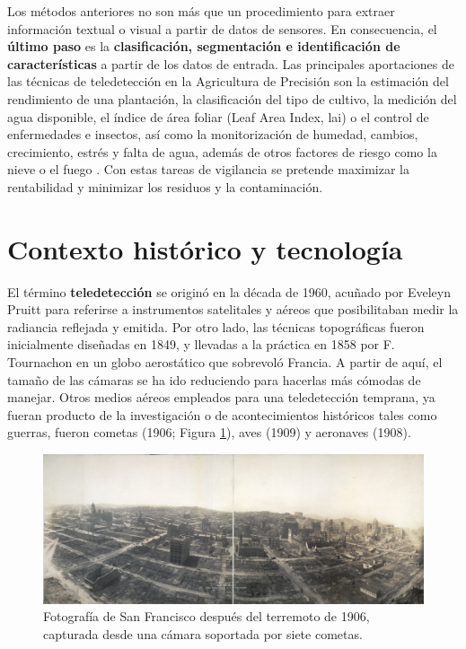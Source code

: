 Los métodos anteriores no son más que un procedimiento para extraer información textual o visual a partir de datos de sensores. En consecuencia, el \textbf{último paso} es la \textbf{clasificación, segmentación e identificación de características} a partir de los datos de entrada. Las principales aportaciones de las técnicas de teledetección en la Agricultura de Precisión son la estimación del rendimiento de una plantación, la clasificación del tipo de cultivo, la medición del agua disponible, el índice de área foliar (Leaf Area Index, \acrshort{lai}) o el control de enfermedades e insectos, así como la monitorización de humedad, cambios, crecimiento, estrés y falta de agua, además de otros factores de riesgo como la nieve o el fuego \cite{huang_agricultural_2018}. Con estas tareas de vigilancia se pretende maximizar la rentabilidad y minimizar los residuos y la contaminación. 

\section{Contexto histórico y tecnología}

El término \textbf{teledetección} se originó en la década de 1960, acuñado por Eveleyn Pruitt para referirse a instrumentos satelitales y aéreos que posibilitaban medir la radiancia reflejada y emitida. Por otro lado, las técnicas topográficas fueron inicialmente diseñadas en 1849, y llevadas a la práctica en 1858 por F. Tournachon en un globo aerostático que sobrevoló Francia. A partir de aquí, el tamaño de las cámaras se ha ido reduciendo para hacerlas más cómodas de manejar. Otros medios aéreos empleados para una teledetección temprana, ya fueran producto de la investigación o de acontecimientos históricos tales como guerras, fueron cometas (1906; Figura \ref{fig:san_francisco_kite_spanish}), aves (1909) y aeronaves (1908). 

\begin{figure}[!ht]
	\includegraphics[width=0.95\linewidth]{figs/introduction/san_francisco_kitecamera.jpg}
	\caption{Fotografía de San Francisco después del terremoto de 1906, capturada desde una cámara soportada por siete cometas. }
    \label{fig:san_francisco_kite_spanish}
\end{figure}

